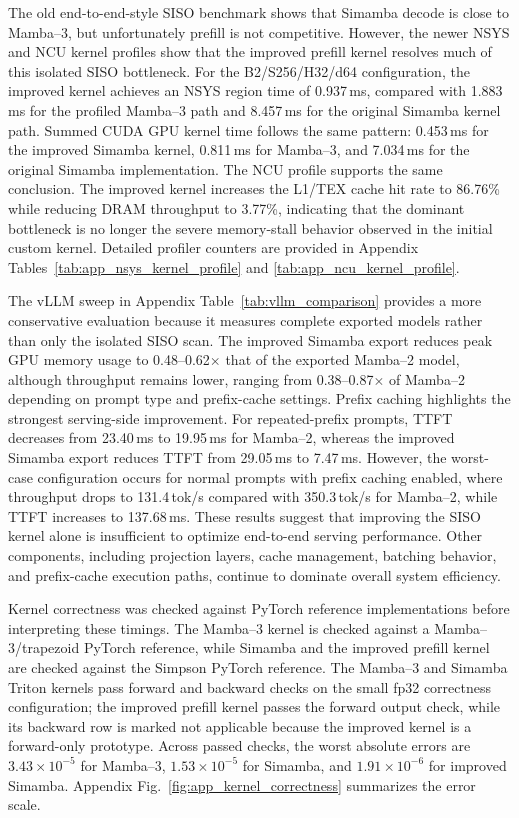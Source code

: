 \documentclass[conference]{IEEEtran}
\newcommand{\modelname}{Simamba\xspace}
\newcommand{\mambatwo}{Mamba--2\xspace}
\newcommand{\mambathree}{Mamba--3\xspace}
\begin{document}
The old end-to-end-style SISO benchmark shows that \modelname decode is close to \mambathree, but unfortunately prefill is not competitive. However, the newer NSYS and NCU kernel profiles show that the improved prefill kernel resolves much of this isolated SISO bottleneck. For the B2/S256/H32/d64 configuration, the improved kernel achieves an NSYS region time of 0.937\,ms, compared with 1.883\,ms for the profiled \mambathree path and 8.457\,ms for the original \modelname kernel path. Summed CUDA GPU kernel time follows the same pattern: 0.453\,ms for the improved \modelname kernel, 0.811\,ms for \mambathree, and 7.034\,ms for the original \modelname implementation. The NCU profile supports the same conclusion. The improved kernel increases the L1/TEX cache hit rate to 86.76\% while reducing DRAM throughput to 3.77\%, indicating that the dominant bottleneck is no longer the severe memory-stall behavior observed in the initial custom kernel. Detailed profiler counters are provided in Appendix Tables~\ref{tab:app_nsys_kernel_profile} and \ref{tab:app_ncu_kernel_profile}.

The vLLM sweep in Appendix Table~\ref{tab:vllm_comparison} provides a more conservative evaluation because it measures complete exported models rather than only the isolated SISO scan. The improved \modelname export reduces peak GPU memory usage to 0.48--0.62$\times$ that of the exported \mambatwo model, although throughput remains lower, ranging from 0.38--0.87$\times$ of \mambatwo depending on prompt type and prefix-cache settings. Prefix caching highlights the strongest serving-side improvement. For repeated-prefix prompts, TTFT decreases from 23.40\,ms to 19.95\,ms for \mambatwo, whereas the improved \modelname export reduces TTFT from 29.05\,ms to 7.47\,ms. However, the worst-case configuration occurs for normal prompts with prefix caching enabled, where throughput drops to 131.4\,tok/s compared with 350.3\,tok/s for \mambatwo, while TTFT increases to 137.68\,ms. These results suggest that improving the SISO kernel alone is insufficient to optimize end-to-end serving performance. Other components, including projection layers, cache management, batching behavior, and prefix-cache execution paths, continue to dominate overall system efficiency.

Kernel correctness was checked against PyTorch reference implementations before interpreting these timings. The \mambathree kernel is checked against a Mamba--3/trapezoid PyTorch reference, while \modelname and the improved prefill kernel are checked against the Simpson PyTorch reference. The \mambathree and \modelname Triton kernels pass forward and backward checks on the small fp32 correctness configuration; the improved prefill kernel passes the forward output check, while its backward row is marked not applicable because the improved kernel is a forward-only prototype. Across passed checks, the worst absolute errors are $3.43\times10^{-5}$ for \mambathree, $1.53\times10^{-5}$ for \modelname, and $1.91\times10^{-6}$ for improved \modelname. Appendix Fig.~\ref{fig:app_kernel_correctness} summarizes the error scale.
\end{document}
